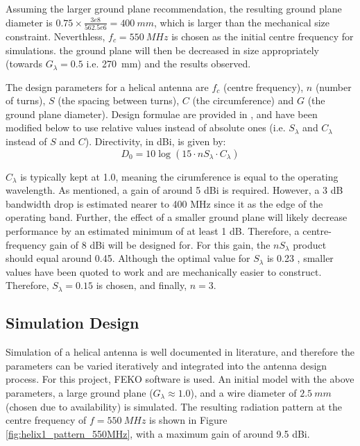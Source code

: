 Assuming the larger ground plane recommendation, the resulting ground plane diameter is $0.75 \times \frac{3e8}{562.5e6} = \SI{400}{mm}$, which is larger than the mechanical size constraint. Neverthless, $f_c = \SI{550}{MHz}$ is chosen as the initial centre frequency for simulations. the ground plane will then be decreased in size appropriately (towards $G_\lambda = 0.5$ i.e. \SI{270}{mm}) and the results observed.

The design parameters for a helical antenna are $f_c$ (centre frequency), $n$ (number of turns), $S$ (the spacing between turns), $C$ (the circumference) and $G$ (the ground plane diameter). Design formulae are provided in \cite{textbook-antennaTheoryAnalysisDesign}, and have been modified below to use relative values instead of absolute ones (i.e. $S_\lambda$ and $C_\lambda$ instead of $S$ and $C$). Directivity, in dBi, is given by:
$$
D_0 = 10 \log(15 \cdot n S_\lambda \cdot C_\lambda)
$$

$C_\lambda$ is typically kept at 1.0, meaning the cirumference is equal to the operating wavelength. As mentioned, a gain of around 5 dBi is required. However, a 3 dB bandwidth drop is estimated nearer to 400 MHz since it as the edge of the operating band. Further, the effect of a smaller ground plane will likely decrease performance by an estimated minimum of at least 1 dB. Therefore, a centre-frequency gain of 8 dBi will be designed for. For this gain, the $n S_\lambda$ product should equal around 0.45. Although the optimal value for $S_\lambda$ is 0.23 \cite{textbook-antennaTheoryAnalysisDesign}, smaller values have been quoted to work \cite{site-helicalCalculator} and are mechanically easier to construct. Therefore, $S_\lambda = 0.15$ is chosen, and finally, $n = 3$.

\newpage
\subsection{Simulation Design}
Simulation of a helical antenna is well documented in literature, and therefore the parameters can be varied iteratively and integrated into the antenna design process. For this project, FEKO software is used. An initial model with the above parameters, a large ground plane ($G_\lambda \approx 1.0$), and a wire diameter of $\SI{2.5}{mm}$ (chosen due to availability) is simulated. The resulting radiation pattern at the centre frequency of $f = \SI{550}{MHz}$ is shown in Figure \ref{fig:helix1_pattern_550MHz}, with a maximum gain of around 9.5 dBi.

